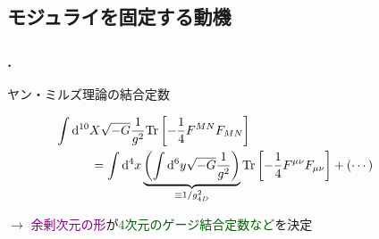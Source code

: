 \documentclass[
  a4paper,uplatex,dvipdfmx,11pt,
  xcolor = {dvipsnames,svgnames},
  hyperref ={colorlinks=true,citecolor=Navy,linkcolor=NavyBlue,urlcolor=purple}
]{beamer}
\begin{document}
\begin{frame}[plain]

\end{frame}

\subsection{モジュライを固定する動機}

\begin{frame}
  \frametitle{\thesubsection.\ \subsecname}

  ヤン・ミルズ理論の結合定数

    \begin{align}
      &\hspace{-1cm}
      \int\dd^{10}X
      \sqrt{-G}\frac{1}{g^2}\text{Tr}\left[ -\frac{1}{4}F^{MN}F_{MN} \right]
      \nonumber
      \\
      &=
      \int\dd^{4}x
      \underbrace{
        \left(  
          \int\dd^{6}y
          \sqrt{-G}\frac{1}{g^2}
        \right)
      }_{\equiv 1/g_{4D}^2}
      \text{Tr}\left[ -\frac{1}{4}F^{\mu\nu}F_{\mu\nu} \right]
      +
      (\cdots)
      \nonumber
    \end{align}
    
    $\longrightarrow$
    \textcolor{DarkMagenta}{余剰次元の形}が\textcolor{DarkGreen}{4次元のゲージ結合定数など}を決定

\end{frame}
\end{document}
